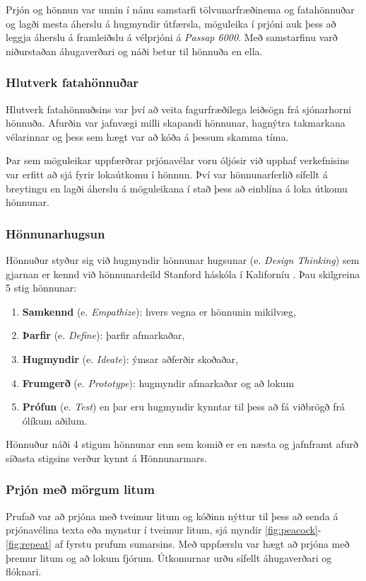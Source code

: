 Prjón og hönnun var unnin í nánu samstarfi tölvunarfræðinema og fatahönnuðar og lagði mesta áherslu á hugmyndir útfærsla, möguleika í prjóni auk þess að leggja áherslu á framleiðslu á vélprjóni á \textit{Passap 6000}. Með  samstarfinu varð niðurstaðan áhugaverðari og náði betur til hönnuða en ella. 

\subsubsection{Hlutverk fatahönnuðar}
Hlutverk fatahönnuðsins var því að veita fagurfræðilega leiðsögn frá sjónarhorni hönnuða. Afurðin var jafnvægi milli skapandi hönnunar, hagnýtra takmarkana vélarinnar og þess sem hægt var að kóða á þessum skamma tíma. 

Þar sem möguleikar uppfærðrar prjónavélar voru óljósir við upphaf verkefnisins var erfitt að sjá fyrir lokaútkomu í hönnun. Því var hönnunarferlið sífellt á breytingu en lagði áherslu á möguleikana í stað þess að einblína á loka útkomu hönnunar. 

\subsubsection{Hönnunarhugsun}
Hönnuður styður sig við hugmyndir hönnunar hugsunar (e. \textit{Design Thinking}) sem gjarnan er kennd við hönnunardeild Stanford háskóla í Kaliforníu \cite{designthinking}.  Þau skilgreina 5 stig hönnunar:
\begin{enumerate}
    \item \textbf{Samkennd} (e. \textit{Empathize}): hvers vegna er hönnunin mikilvæg,
    \item \textbf{Þarfir} (e. \textit{Define}): þarfir afmarkaðar,
    \item \textbf{Hugmyndir} (e. \textit{Ideate}): ýmsar aðferðir skoðaðar,
    \item \textbf{Frumgerð} (e. \textit{Prototype}): hugmyndir afmarkaðar og að lokum
    \item \textbf{Prófun} (e. \textit{Test}) en þar eru hugmyndir kynntar til þess að fá viðbrögð frá ólíkum aðilum.
\end{enumerate}
Hönnuður náði  4 stigum hönnunar enn sem komið er en næsta og jafnframt afurð síðasta stigsins verður kynnt á Hönnunarmars.

\subsubsection{Prjón með mörgum litum}
Prufað var að prjóna með tveimur litum og kóðinn nýttur til þess að senda á prjónavélina texta eða mynstur í tveimur litum, sjá myndir \ref{fig:peacock}-\ref{fig:repeat} af fyrstu prufum sumarsins. Með uppfærslu var hægt að prjóna með þremur litum og að lokum fjórum. Útkomurnar urðu sífellt áhugaverðari og flóknari. 

